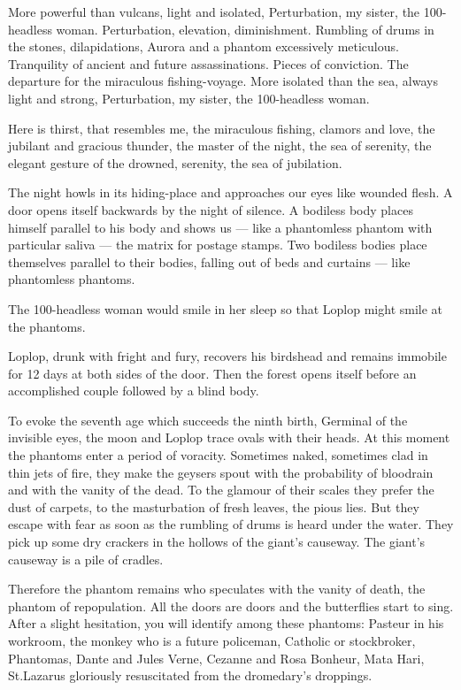 \documentclass{essay}
\begin{document}
\begin{essaystyle}
More powerful than vulcans, light and isolated, Perturbation, my sister, the
100-headless woman. Perturbation, elevation, diminishment. Rumbling of drums in
the stones, dilapidations, Aurora and a phantom excessively meticulous.
Tranquility of ancient and future assassinations. Pieces of conviction. The
departure for the miraculous fishing-voyage.  More isolated than the sea,
always light and strong, Perturbation, my sister, the 100-headless woman.

Here is thirst, that resembles me, the miraculous fishing, clamors and love,
the jubilant and gracious thunder, the master of the night, the sea of
serenity, the elegant gesture of the drowned, serenity, the sea of jubilation.

The night howls in its hiding-place and approaches our eyes like wounded flesh.
A door opens itself backwards by the night of silence. A bodiless body places
himself parallel to his body and shows us --- like a phantomless phantom with
particular saliva --- the matrix for postage stamps. Two bodiless bodies place
themselves parallel to their bodies, falling out of beds and curtains --- like
phantomless phantoms.

The 100-headless woman would smile in her sleep so that Loplop might smile at
the phantoms.

Loplop, drunk with fright and fury, recovers his birdshead and remains immobile
for 12 days at both sides of the door. Then the forest opens itself before an
accomplished couple followed by a blind body.

To evoke the seventh age which succeeds the ninth birth, Germinal of the
invisible eyes, the moon and Loplop trace ovals with their heads. At this
moment the phantoms enter a period of voracity. Sometimes naked, sometimes clad
in thin jets of fire, they make the geysers spout with the probability of
bloodrain and with the vanity of the dead. To the glamour of their scales they
prefer the dust of carpets, to the masturbation of fresh leaves, the pious
lies. But they escape with fear as soon as the rumbling of drums is heard under
the water. They pick up some dry crackers in the hollows of the giant's
causeway. The giant's causeway is a pile of cradles.

Therefore the phantom remains who speculates with the vanity of death, the
phantom of repopulation. All the doors are doors and the butterflies start to
sing. After a slight hesitation, you will identify among these phantoms:
Pasteur in his workroom, the monkey who is a future policeman, Catholic or
stockbroker, Phantomas, Dante and Jules Verne, Cezanne and Rosa Bonheur, Mata
Hari, St.\@ Lazarus gloriously resuscitated from the dromedary's droppings.


\end{essaystyle}
\end{document}
